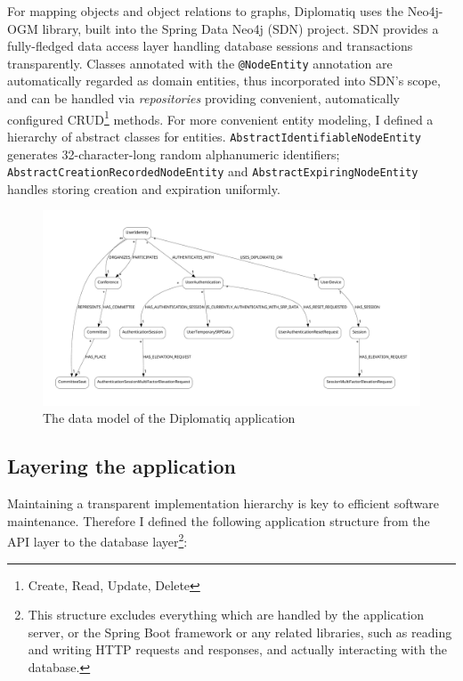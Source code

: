 For mapping objects and object relations to graphs, Diplomatiq uses the Neo4j-OGM library, built into the Spring Data Neo4j (SDN) project. SDN provides a fully-fledged data access layer handling database sessions and transactions transparently. Classes annotated with the \lstinline{@NodeEntity} annotation are automatically regarded as domain entities, thus incorporated into SDN's scope, and can be handled via \emph{repositories} providing convenient, automatically configured CRUD\footnote{Create, Read, Update, Delete} methods. For more convenient entity modeling, I defined a hierarchy of abstract classes for entities. \lstinline{AbstractIdentifiableNodeEntity} generates 32-character-long random alphanumeric identifiers; \lstinline{AbstractCreationRecordedNodeEntity} and \lstinline{AbstractExpiringNodeEntity} handles storing creation and expiration uniformly.

\begin{figure}
    \centering
    \includegraphics[width=\textheight]{figures/data-model.pdf}
    \caption{The data model of the Diplomatiq application}
    \label{fig:data-model}
\end{figure}

\subsection{Layering the application}

Maintaining a transparent implementation hierarchy is key to efficient software maintenance. Therefore I defined the following application structure from the API layer to the database layer\footnote{This structure excludes everything which are handled by the application server, or the Spring Boot framework or any related libraries, such as reading and writing HTTP requests and responses, and actually interacting with the database.}:

